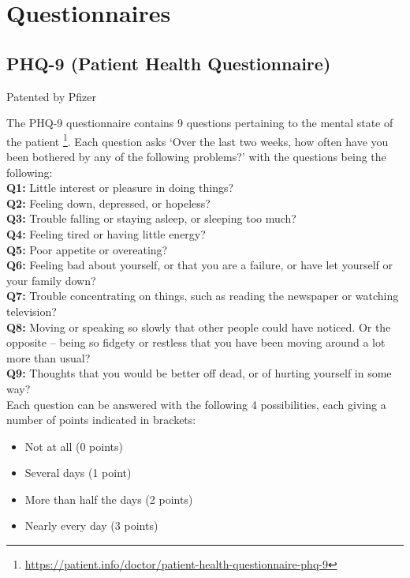 \chapter{Questionnaires}
\label{appendix:questionnaires}
\section{PHQ-9 (Patient Health Questionnaire)}
Patented by Pfizer

The PHQ-9 questionnaire contains 9 questions pertaining to the mental state of the patient \footnote{\url{https://patient.info/doctor/patient-health-questionnaire-phq-9}}. Each question asks ‘Over the last two weeks, how often have you been bothered by any of the following problems?’ with the questions being the following: \\

\textbf{Q1:} Little interest or pleasure in doing things? \\

\textbf{Q2:} Feeling down, depressed, or hopeless? \\

\textbf{Q3:} Trouble falling or staying asleep, or sleeping too much? \\

\textbf{Q4:} Feeling tired or having little energy? \\

\textbf{Q5:} Poor appetite or overeating? \\

\textbf{Q6:} Feeling bad about yourself, or that you are a failure, or have let yourself or your family down? \\

\textbf{Q7:} Trouble concentrating on things, such as reading the newspaper or watching television? \\

\textbf{Q8:} Moving or speaking so slowly that other people could have noticed. Or the opposite – being so fidgety or restless that you have been moving around a lot more than usual? \\

\textbf{Q9:} Thoughts that you would be better off dead, or of hurting yourself in some way? \\

Each question can be answered with the following 4 possibilities, each giving a number of points indicated in brackets:

\begin{itemize}
\item Not at all (0 points)
\item Several days (1 point)
\item More than half the days (2 points)
\item Nearly every day (3 points)
\end{itemize}

